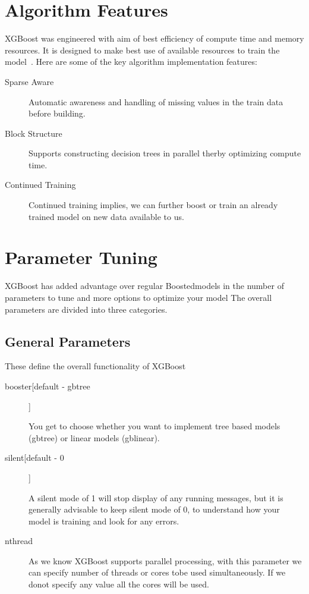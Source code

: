 \section{Algorithm Features} 

XGBoost was engineered with aim of best efficiency of compute time and memory
resources. It is designed to make best use of available resources to train the
model~\cite{hid-sp18-401-XGBoost-MLmastery}. Here are some of the key algorithm
implementation features:

\begin{description}

\item[Sparse Aware]

Automatic awareness and handling of missing values in the train data before 
building.

\item[Block Structure]

Supports constructing decision trees in parallel therby optimizing compute
time.

\item[Continued Training] 

Continued training implies, we can further boost or train an already trained
model on new data available to us.

\end{description}


\section{Parameter Tuning} 

XGBoost has added advantage over regular Boostedmodels in the number of
parameters  to tune and more options to optimize your model The overall
parameters are divided  into three categories.

\subsection{General Parameters}

These define the overall functionality of XGBoost

\begin{description}

\item[booster[default - gbtree]]

You get to choose whether you want to implement tree based models (gbtree) or
linear  models (gblinear).

\item[silent[default - 0]]

A silent mode of 1 will stop display of any running messages, but it is
generally  advisable to keep silent mode of 0, to understand how your model is
training and  look for any errors.

\item[nthread]

As we know XGBoost supports parallel processing, with this parameter we can
specify number of threads or cores tobe used simultaneously. If we donot 
specify any value  all the cores will be used.

\end{description}

